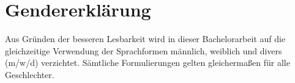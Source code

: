 \section*{Gendererklärung}
Aus Gründen der besseren Lesbarkeit wird in dieser Bachelorarbeit auf die gleichzeitige Verwendung der Sprachformen männlich, weiblich und divers (m/w/d) verzichtet. Sämtliche Formulierungen gelten gleichermaßen für alle Geschlechter.